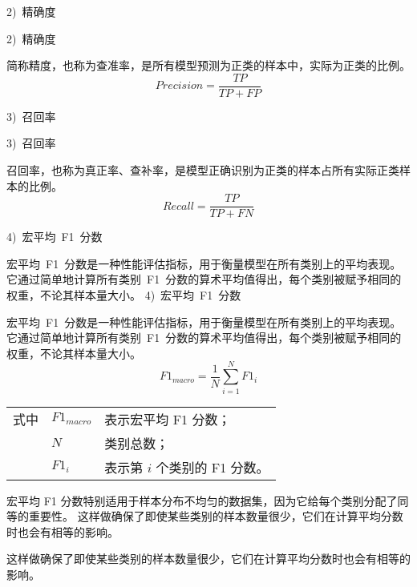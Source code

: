 2)~精确度\par
2)~精确度\par
简称精度，也称为查准率，是所有模型预测为正类的样本中，实际为正类的比例。
\begin{equation}
	\label{eq:val_score2}
	Precision = \frac{TP}{TP + FP}
\end{equation}

3)~召回率\par
3)~召回率\par
召回率，也称为真正率、查补率，是模型正确识别为正类的样本占所有实际正类样本的比例。
\begin{equation}
	\label{eq:val_score3}
	Recall = \frac{TP}{TP + FN}
\end{equation}

4)~宏平均~F1~分数\par
宏平均~F1~分数是一种性能评估指标，用于衡量模型在所有类别上的平均表现。
它通过简单地计算所有类别~F1~分数的算术平均值得出，每个类别被赋予相同的权重，不论其样本量大小。
4)~宏平均~F1~分数\par
宏平均~F1~分数是一种性能评估指标，用于衡量模型在所有类别上的平均表现。
它通过简单地计算所有类别~F1~分数的算术平均值得出，每个类别被赋予相同的权重，不论其样本量大小。
\begin{equation}
	\label{eq:val_score4}
	F1_{macro} = \frac{1}{N} \sum\limits_{i=1}^{N} F1_i
\end{equation}
\begin{flushleft}
	\renewcommand\arraystretch{1.25}
	\begin{tabularx}{\textwidth}{@{}>{\normalsize\rm}l@{\quad}>{\normalsize\rm}l@{——}>{\normalsize\rm}X@{}}
		式中 & $F1_{macro}$ & 表示宏平均 F1 分数；          \\
		     & $N$          & 类别总数；                    \\
		     & $F1_i$       & 表示第 $i$ 个类别的 F1 分数。 \\
	\end{tabularx}\vspace{.5ex}
\end{flushleft}
宏平均 F1 分数特别适用于样本分布不均匀的数据集，因为它给每个类别分配了同等的重要性。
这样做确保了即使某些类别的样本数量很少，它们在计算平均分数时也会有相等的影响。\par
这样做确保了即使某些类别的样本数量很少，它们在计算平均分数时也会有相等的影响。\par

